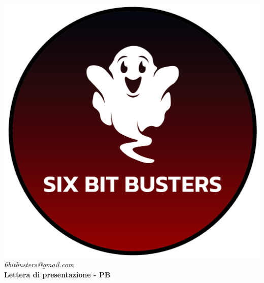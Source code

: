 \thispagestyle{empty}
\renewcommand{\arraystretch}{1.0}


\begin{titlepage}
	\begin{center}
	\includegraphics[scale = 0.5]{template/images/logo-circle.png}
	\\[1cm]
	\href{mailto:6bitbusters@gmail.com}		      	
	{\large{\textit{6bitbusters@gmail.com} } }\\[1cm]
	
	{\Huge{ \textbf{Lettera di presentazione - PB} } }\\[1cm]
        \end{center}
	
\end{titlepage}
